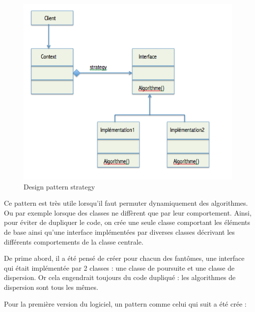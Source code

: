 \documentclass[a4paper,12pt]{report} %
\begin{document}
\begin{figure}[!h] %
		\centering
		\includegraphics[scale=0.7]{ressources/StrategyDesignPattern.png}
		\caption{Design pattern strategy}
\end{figure} 



Ce pattern est très utile lorsqu'il faut permuter dynamiquement des algorithmes.
Ou par exemple lorsque des classes ne diffèrent que par leur comportement. Ainsi, pour éviter de dupliquer le code, on crée une seule classe comportant les éléments de base ainsi qu'une interface implémentées par diverses classes décrivant les différents comportements de la classe centrale.

De prime abord, il a été pensé de créer pour chacun des fantômes, une interface qui était implémentée par 2 classes : une classe de poursuite et une classe de dispersion.
Or cela engendrait toujours du code dupliqué : les algorithmes de dispersion sont tous les mêmes.

Pour la première version du logiciel, un pattern comme celui qui suit a été crée :
\end{document}
